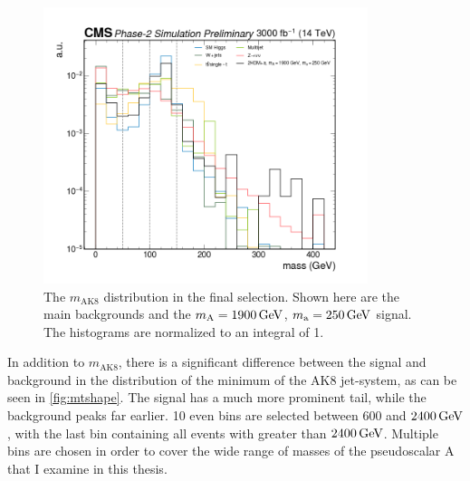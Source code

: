 \begin{figure}[ht]
\centering
\includegraphics[width=0.845\textwidth]{Chapters/Signal_Extraction/shape_AK8_sdmass.png}
\caption{The $m_\text{AK8}$ distribution in the final selection. Shown here are the main backgrounds and the $m_\mathrm{A} = \GeV{1900}$, $m_\mathrm{a} = \GeV{250}$ signal. The histograms are normalized to an integral of 1.}
\label{fig:ak8massshape}
\end{figure}

In addition to $m_\text{AK8}$, there is a significant difference between the signal and background in the distribution of the minimum \mt of the AK8 jet-\ptmiss system, as can be seen in \cref{fig:mtshape}. The signal has a much more prominent tail, while the background peaks far earlier. 10 even \mt bins are selected between $600$ and $\GeV{2400}$ , with the last bin containing all events with \mt greater than $\GeV{2400}$. Multiple \mt bins are chosen in order to cover the wide range of masses of the pseudoscalar A that I examine in this thesis.

